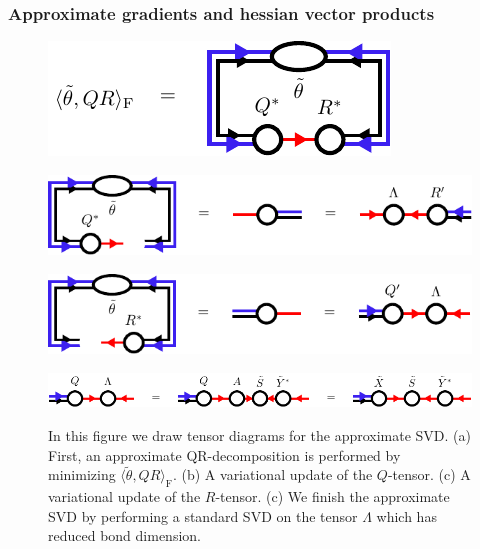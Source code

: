 \subsubsection*{Approximate gradients and hessian vector products}
\begin{figure}
	\centering
	\subcaptionbox{\label{fig:approximate_svd_overlap}}
	{%
		\includegraphics[scale=1]{figures/tikz/disoTPS/approximate_svd/approximate_svd_a.pdf}
	}
	\par\bigskip
	\subcaptionbox{\label{fig:approximate_svd_first_step}}
	{%
		\includegraphics[scale=1]{figures/tikz/disoTPS/approximate_svd/approximate_svd_b.pdf}
	}
	\par\bigskip
	\subcaptionbox{\label{fig:approximate_svd_second_step}}
	{%
		\includegraphics[scale=1]{figures/tikz/disoTPS/approximate_svd/approximate_svd_c.pdf}
	}
	\par\bigskip
	\subcaptionbox{\label{fig:approximate_svd_final_step}}
	{%
		\includegraphics[scale=1]{figures/tikz/disoTPS/approximate_svd/approximate_svd_d.pdf}
	}
	\caption{In this figure we draw tensor diagrams for the approximate SVD. (a) First, an approximate QR-decomposition is performed by minimizing $\langle\tilde{\theta},QR\rangle_\text{F}$. (b) A variational update of the $Q$-tensor. (c) A variational update of the $R$-tensor. (c) We finish the approximate SVD by performing a standard SVD on the tensor $\Lambda$ which has reduced bond dimension.}
	\label{fig:approximate_qr_decomposition}
\end{figure}
